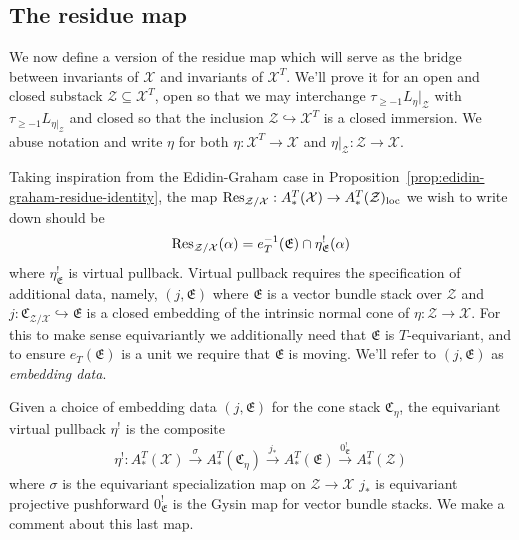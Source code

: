 \subsection{The residue map}\label{rl-000V}\label{sec:the-residue-map}


We now define a version of the residue map which will serve as the bridge between invariants of \(\mathcal X\) and invariants of \(\mathcal X^T\). We'll prove it for an open and closed substack \(\mathcal Z\subseteq \mathcal X^T\), open so that we may interchange \(\tau_{\geq -1}L_\eta|_{\mathcal Z}\) with \(\tau_{\geq -1}L_{\eta|_{\mathcal Z}}\) and closed so that the inclusion \(\mathcal Z\hookrightarrow \mathcal X^T\) is a closed immersion. We abuse notation and write \(\eta\) for both \(\eta:\mathcal X^T\to \mathcal X\) and \(\eta|_{\mathcal Z}:\mathcal Z\to \mathcal X\).

Taking inspiration from the Edidin-Graham case in Proposition~\ref{prop:edidin-graham-residue-identity}, the map \(\operatorname{Res}_{\mathcal Z/\mathcal X}:A_*^T(\mathcal X)\to A_*^T(\mathcal Z)_{\operatorname{loc}}\) we wish to write down should be
\begin{align}\label{eqn:preliminary-Res-defn}
  \operatorname{Res}_{\mathcal Z/\mathcal X}(\alpha) = e_T^{-1}(\mathfrak E)\cap \eta^!_{\mathfrak E}(\alpha)
\end{align}
where \(\eta^!_{\mathfrak E}\) is virtual pullback. Virtual pullback requires the specification of additional data, namely, \((j,\mathfrak E)\) where \(\mathfrak E\) is a vector bundle stack over \(\mathcal Z\) and \(j:\mathfrak C_{\mathcal Z/\mathcal X}\hookrightarrow \mathfrak E\) is a closed embedding of the intrinsic normal cone of \(\eta:\mathcal Z\to \mathcal X\). For this to make sense equivariantly we additionally need that \(\mathfrak E\) is \(T\)-equivariant, and to ensure \(e_T(\mathfrak E)\) is a unit we require that \(\mathfrak E\) is moving. We'll refer to $(j,\mathfrak E)$ as \emph{embedding data}.

Given a choice of embedding data \((j, \mathfrak E)\) for the cone stack \(\mathfrak C_\eta\), the equivariant virtual pullback \(\eta^!\) \cite{manolache_VirtualPullbacks2012} is the composite
\begin{align*}
  \eta^!:A^T_*(\mathcal X) \xrightarrow{\sigma} A^T_*(\mathfrak C_\eta) \xrightarrow{j_*} A^T_*(\mathfrak E) \xrightarrow{0^!_{\mathfrak E}} A^T_*(\mathcal Z)
\end{align*}
where \(\sigma\) is the equivariant specialization map on \(\mathcal Z \to \mathcal X\) \(j_*\) is equivariant projective pushforward \(0^!_{\mathfrak E}\) is the Gysin map for vector bundle stacks. We make a comment about this last map.

